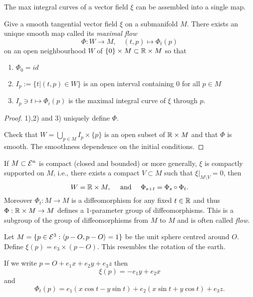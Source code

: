 The max integral curves of a vector field $\xi$ can be assembled into a single map.

\begin{theorem, definition}
	Give a smooth tangential vector field $\xi$ on a submanifold $M$. There exists an unique smooth map called its \emph{maximal flow}
		\[ \Phi : W \to M, \quad (t,p) \mapsto \Phi_t(p) \]
	on an open neighbourhood $W$ of $\{0\}\times M \subset \mathbb R\times M$ so that 
	\begin{enumerate}
		\item $\Phi_0=id$
		\item $I_p:= \{ t| (t,p) \in W \}$ is an open interval containing $0$ for all $p \in M$
		\item $I_p \ni t \mapsto \Phi_i (p)$ is the maximal integral curve of $\xi$ through $p$.
	\end{enumerate}
\end{theorem, definition}

\begin{proof}
	1),2) and 3) uniquely define $\Phi$.
	
	Check that $W=\bigcup_{p \in M } I_p \times \{p\}$ is an open subset of $\mathbb R \times M$ and  that $\Phi$ is smooth. The smoothness dependence on the initial conditions. 
\end{proof}

\begin{remark, definition}
	If $M \subset \mathcal E^n$ is compact (closed and bounded) or more generally, $\xi$ is compactly supported on $M$, i.e., there exists a compact $V \subset M$ such that $\xi |_{M \setminus V}=0$, then
		\[ W=\mathbb R \times M, \quad\text{ and }\quad \Phi_{s+t} = \Phi_s \circ \Phi_t. \]
	Moreover $\Phi_t : M \to M$ is a diffeomorphism for any fixed $t \in \mathbb R$ and thus $\Phi: \mathbb R \times M \to M$ defines a $1$-parameter group of diffeomorphisms. This is a subgroup of the group of diffeomorphisms from $M$ to $M$ and is often called \emph{flow}.
\end{remark, definition}

\begin{example}
	Let $M = \{ p \in \mathcal E^3 : \left \langle p-O,p-O \right\rangle =1 \}$ be the unit sphere centred around $O$. Define $\xi(p)= e_3 \times (p-O)$. This resembles the rotation of the earth.
	
	If we write $p=O+ e_1x+e_2y+e_3z$ then 
		\[ \xi(p)=-e_1y + e_2x \]
	and 
		\[ \Phi_t(p)=e_1(x\cos t -y\sin t) + e_2 (x \sin t + y \cos t) + e_3z. \]
\end{example}

